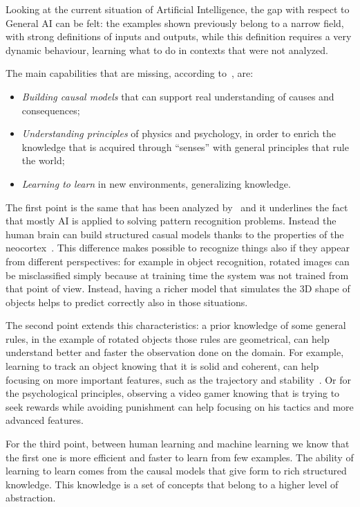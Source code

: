 Looking at the current situation of Artificial Intelligence, the gap with respect to General AI can be felt: the examples shown previously belong to a narrow field, with strong definitions of inputs and outputs, while this definition requires a very dynamic behaviour, learning what to do in contexts that were not analyzed.

The main capabilities that are missing, according to~\cite{lake2017building}, are:

\begin{itemize}
	\item \textit{Building causal models} that can support real understanding of causes and consequences;
	\item \textit{Understanding principles} of physics and psychology, in order to enrich the knowledge that is acquired through ``senses''  with general principles that rule the world;
	\item \textit{Learning to learn} in new environments, generalizing knowledge.
\end{itemize}
The first point is the same that has been analyzed by~\cite{pearl2018theoretical} and it underlines the fact that mostly AI is applied to solving pattern recognition problems. Instead the human brain can build structured casual models thanks to the properties of the neocortex~\cite{hawkins2017theory}. This difference makes possible to recognize things also if they appear from different perspectives: for example in object recognition, rotated images can be misclassified simply because at training time the system was not trained from that point of view. Instead, having a richer model that simulates the 3D shape of objects helps to predict correctly also in those situations.

The second point extends this characteristics: a prior knowledge of some general rules, in the example of rotated objects those rules are geometrical, can help understand better and faster the observation done on the domain. For example, learning to track an object knowing that it is solid and coherent, can help focusing on more important features, such as the trajectory and stability~\cite{lerer2016learning}. Or for the psychological principles, observing a video gamer knowing that is trying to seek rewards while avoiding punishment can help focusing on his tactics and more advanced features.

For the third point, between human learning and machine learning we know that the first one is more efficient and faster to learn from few examples. The ability of learning to learn comes from the causal models that give form to rich structured knowledge. This knowledge is a set of concepts that belong to a higher level of abstraction.

